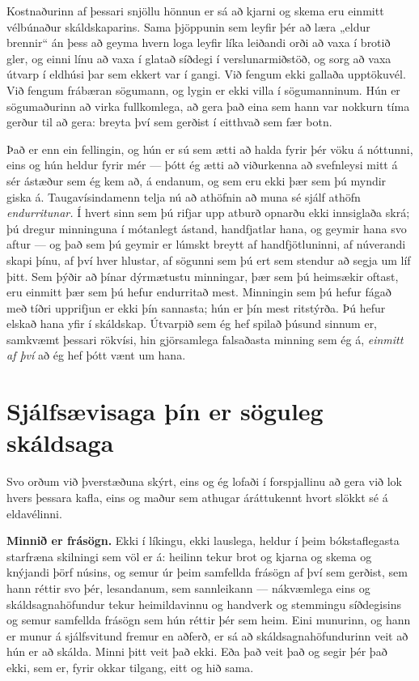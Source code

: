 Kostnaðurinn af þessari snjöllu hönnun er sá að kjarni og skema eru einmitt vélbúnaður skáldskaparins. Sama þjöppunin sem leyfir þér að læra „eldur brennir“ án þess að geyma hvern loga leyfir líka leiðandi orði að vaxa í brotið gler, og einni línu að vaxa í glatað síðdegi í verslunarmiðstöð, og sorg að vaxa útvarp í eldhúsi þar sem ekkert var í gangi. Við fengum ekki gallaða upptökuvél. Við fengum frábæran sögumann, og lygin er ekki villa í sögumanninum. Hún er sögumaðurinn að virka fullkomlega, að gera það eina sem hann var nokkurn tíma gerður til að gera: breyta því sem gerðist í eitthvað sem fær botn.

Það er enn ein fellingin, og hún er sú sem ætti að halda fyrir þér vöku á nóttunni, eins og hún heldur fyrir mér — þótt ég ætti að viðurkenna að svefnleysi mitt á sér ástæður sem ég kem að, á endanum, og sem eru ekki þær sem þú myndir giska á. Taugavísindamenn telja nú að athöfnin að muna sé sjálf athöfn \emph{endurritunar.} Í hvert sinn sem þú rifjar upp atburð opnarðu ekki innsiglaða skrá; þú dregur minninguna í mótanlegt ástand, handfjatlar hana, og geymir hana svo aftur — og það sem þú geymir er lúmskt breytt af handfjötluninni, af núverandi skapi þínu, af því hver hlustar, af sögunni sem þú ert sem stendur að segja um líf þitt. Sem þýðir að þínar dýrmætustu minningar, þær sem þú heimsækir oftast, eru einmitt þær sem þú hefur endurritað mest. Minningin sem þú hefur fágað með tíðri upprifjun er ekki þín sannasta; hún er þín mest ritstýrða. Þú hefur elskað hana yfir í skáldskap. Útvarpið sem ég hef spilað þúsund sinnum er, samkvæmt þessari rökvísi, hin gjörsamlega falsaðasta minning sem ég á, \emph{einmitt af því} að ég hef þótt vænt um hana.

\section*{Sjálfsævisaga þín er söguleg skáldsaga}

Svo orðum við þverstæðuna skýrt, eins og ég lofaði í forspjallinu að gera við lok hvers þessara kafla, eins og maður sem athugar áráttukennt hvort slökkt sé á eldavélinni.

\textbf{Minnið er frásögn.} Ekki í líkingu, ekki lauslega, heldur í þeim bókstaflegasta starfræna skilningi sem völ er á: heilinn tekur brot og kjarna og skema og knýjandi þörf núsins, og semur úr þeim samfellda frásögn af því sem gerðist, sem hann réttir svo þér, lesandanum, sem sannleikann — nákvæmlega eins og skáldsagnahöfundur tekur heimildavinnu og handverk og stemmingu síðdegisins og semur samfellda frásögn sem hún réttir þér sem heim. Eini munurinn, og hann er munur á sjálfsvitund fremur en aðferð, er sá að skáldsagnahöfundurinn veit að hún er að skálda. Minni þitt veit það ekki. Eða það veit það og segir þér það ekki, sem er, fyrir okkar tilgang, eitt og hið sama.

